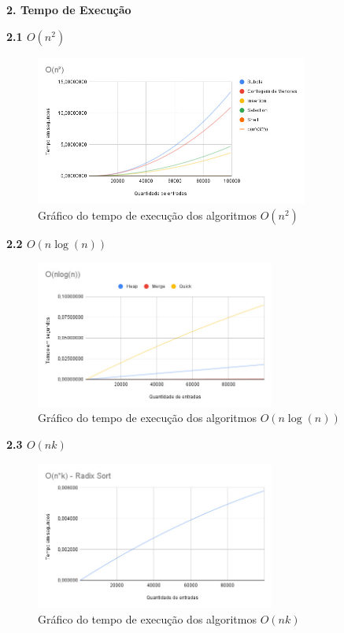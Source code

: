 \documentclass[10pt]{article}
\begin{document}
\vspace{0.25cm}

\textbf{2. Tempo de Execução}

\vspace{0.5cm}

\textbf{2.1 $O(n^2)$}

\begin{figure}[H]
  \centering
  \includegraphics[width=0.8\textwidth]{TempExec1.jpg}
  \caption{Gráfico do tempo de execução dos algoritmos $O(n^2)$}
  \label{fig:1}
\end{figure}

\vspace{0.5cm}

\textbf{2.2 $O(n \log(n))$}

\begin{figure}[H]
  \centering
  \includegraphics[width=0.7\textwidth]{TempoExec2.jpg}
  \caption{Gráfico do tempo de execução dos algoritmos $O(n \log(n))$}
  \label{fig:2}
\end{figure}

\vspace{0.5cm}

\textbf{2.3 $O(n k)$}

\begin{figure}[H]
  \centering
  \includegraphics[width=0.7\textwidth]{TempoExec3.jpg}
  \caption{Gráfico do tempo de execução dos algoritmos $O(n k)$}
  \label{fig:3}
\end{figure}
\end{document}
